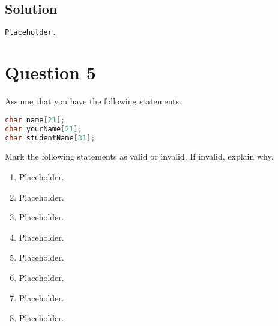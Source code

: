 \documentclass[a4paper, 11pt]{article}
\begin{document}
    \subsection{Solution}
      \begin{lstlisting}[language=bash,caption={Question 4 Solution}]
Placeholder.
      \end{lstlisting}


  \newpage
  \section{Question 5}
    Assume that you have the following statements:

    \begin{lstlisting}[language=c++]
char name[21];
char yourName[21];
char studentName[31];
    \end{lstlisting}
    
    Mark the following statements as valid or invalid. If invalid, explain why.
    
    \begin{enumerate}[label=\Alph*.]
      \item Placeholder.
      \item Placeholder.
      \item Placeholder.
      \item Placeholder.
      \item Placeholder.
      \item Placeholder.
      \item Placeholder.
      \item Placeholder.
    \end{enumerate}
    
\end{document}
